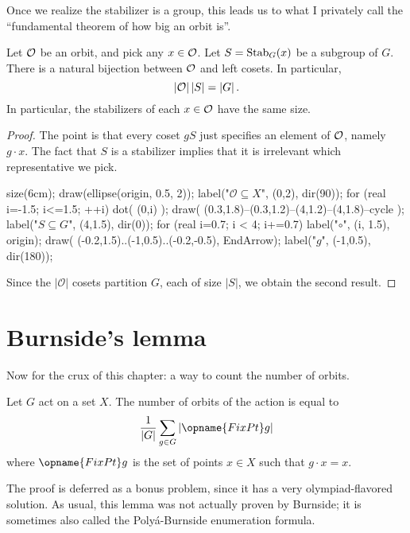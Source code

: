 Once we realize the stabilizer is a group, this leads us to what I privately call the ``fundamental theorem of how big an orbit is''.
\begin{theorem}
	Let $\mathcal O$ be an orbit, and pick any $x \in \mathcal O$.
	Let $S = \operatorname{Stab}_G(x)$ be a subgroup of $G$.
	There is a natural bijection between $\mathcal O$ and left cosets.
	In particular,
	\[ \left\lvert \mathcal O \right\rvert \left\lvert S \right\rvert = \left\lvert G \right\rvert. \]
	In particular, the stabilizers of each $x \in \mathcal O$ have the same size.
\end{theorem}
\begin{proof}
	The point is that every coset $gS$ just specifies an element of $\mathcal O$,
	namely $g \cdot x$. The fact that $S$ is a stabilizer implies
	that it is irrelevant which representative we pick.

	\begin{center}
		\begin{asy}
			size(6cm);
			draw(ellipse(origin, 0.5, 2));
			label("$\mathcal O \subseteq X$", (0,2), dir(90));
			for (real i=-1.5; i<=1.5; ++i) {
				dot( (0,i) );
			}
			draw( (0.3,1.8)--(0.3,1.2)--(4,1.2)--(4,1.8)--cycle );
			label("$S \subseteq G$", (4,1.5), dir(0));
			for (real i=0.7; i < 4; i+=0.7) {
				label("$\circ$", (i, 1.5), origin);
			}
			draw( (-0.2,1.5)..(-1,0.5)..(-0.2,-0.5), EndArrow);
			label("$g$", (-1,0.5), dir(180));
		\end{asy}
	\end{center}

	Since the $\left\lvert \mathcal O \right\rvert$ cosets partition $G$,
	each of size $\left\lvert S \right\rvert$, we obtain the second result.
\end{proof}

\section{Burnside's lemma}
Now for the crux of this chapter: a way to count the number of orbits.
\begin{theorem}
	Let $G$ act on a set $X$.
	The number of orbits of the action is equal to
	\[ \frac{1}{\left\lvert G \right\rvert}
		\sum_{g \in G} \left\lvert \opname{FixPt} g \right\rvert \]
	where $\opname{FixPt} g$ is the set of points $x \in X$
	such that $g \cdot x = x$.
\end{theorem}
The proof is deferred as a bonus problem, since it has a very olympiad-flavored solution.
As usual, this lemma was not actually proven by Burnside;
it is sometimes also called the Poly\'a-Burnside enumeration formula.


